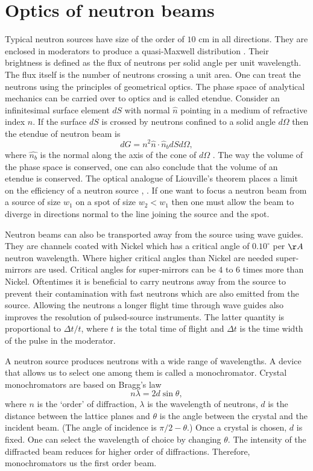 \documentclass{article}
\numberwithin{equation}{section}
\begin{document}
\section{Optics of neutron beams}\label{s7}
Typical neutron sources have size of the order of $10$ cm in all directions.
They are enclosed in moderators to produce a quasi-Maxwell distribution
\cite{anderson2008neutron}. Their brightness is defined as the flux of neutrons
per solid angle per unit wavelength. The flux itself is the number of neutrons
crossing a unit area. One can treat the neutrons using the principles of
geometrical optics. The phase space of analytical mechanics can be carried over
to optics and is called etendue. Consider an infinitesimal surface element 
$dS$ with normal $\hat{n}$ pointing in a medium of refractive index $n$. If
the surface $dS$ is crossed by neutrons confined to a solid angle $d\Omega$
then the etendue of neutron beam is
\begin{equation}\label{s7e1}
dG = n^2\hat{n}\cdot\hat{n}_b dSd\Omega,
\end{equation}
where $\hat{n_b}$ is the normal along the axis of the cone of $d\Omega$ 
\cite{markvart2007thermodynamics}. The way the volume of the phase space is
conserved, one can also conclude that the volume of an etendue is conserved. 
The optical analogue of Liouville's theorem places a limit on the efficiency
of a neutron source \cite{anderson2008neutron}, 
\cite{markvart2007thermodynamics}. If one want to focus a neutron beam from
a source of size $w_1$ on a spot of size $w_2 < w_1$ then one must allow the
beam to diverge in directions normal to the line joining the source and the
spot.

Neutron beams can also be transported away from the source using wave guides.
They are channels coated with Nickel which has a critical angle of $0.10^\circ$
per $\AA$ neutron wavelength. Where higher critical angles than Nickel are 
needed super-mirrors are used. Critical angles for super-mirrors can be $4$
to $6$ times more than Nickel. Oftentimes it is beneficial to carry neutrons
away from the source to prevent their contamination with fast neutrons which
are also emitted from the source. Allowing the neutrons a longer flight time
through wave guides also improves the resolution of pulsed-source instruments.
The latter quantity is proportional to $\Delta t/t$, where $t$ is the total
time of flight and $\Delta t$ is the time width of the pulse in the moderator.

A neutron source produces neutrons with a wide range of wavelengths. A device
that allows us to select one among them is called a monochromator. Crystal
monochromators are based on Bragg's law
\begin{equation}\label{s7e2}
n\lambda = 2d\sin\theta,
\end{equation}
where $n$ is the `order' of diffraction, $\lambda$ is the wavelength of 
neutrons, $d$ is the distance between the lattice planes and $\theta$ is the
angle between the crystal and the incident beam. (The angle of incidence is
$\pi/2 - \theta$.) Once a crystal is chosen, $d$ is fixed. One can select
the wavelength of choice by changing $\theta$. The intensity of the diffracted
beam reduces for higher order of diffractions. Therefore, monochromators us
the first order beam.
\end{document}
